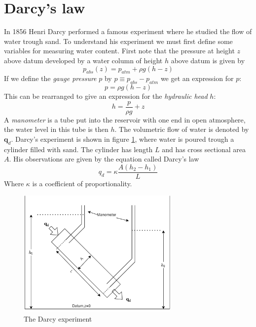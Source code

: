 \documentclass[../Main/main.tex]{subfiles}
\begin{document}
\section*{Darcy's law}
In 1856 Henri Darcy performed a famous experiment where he studied the flow of water trough sand. To understand his experiment we must first define some variables for measuring water content. First note that the pressure at height $z$ above datum developed by a water column of height $h$ above datum is given by
\begin{equation*}
p_{abs}(z) = p_{atm} + \rho g(h-z)
\end{equation*}
If we define the \emph{gauge pressure} $p$ by $p \equiv p_{abs}-p_{atm}$ we get an expression for $p$:
\begin{equation*}
p = \rho g(h-z)
\end{equation*}
This can be rearranged to give an expression for the \emph{hydraulic head} $h$:
\begin{equation}\label{eq:hydraulic}
h = \frac{p}{\rho g} + z
\end{equation}
A \emph{manometer} is a tube put into the reservoir with one end in open atmosphere, the water level in this tube is then $h$. The volumetric flow of water is denoted by $\textbf{q}_d$. Darcy's experiment is shown in figure \ref{fig:darcy}, where water is poured trough a cylinder filled with sand. The cylinder has length $L$ and has cross sectional area $A$. His observations are given by the equation called Darcy's law
\begin{equation}
q_d = \kappa \frac{A(h_2-h_1)}{L}
\end{equation}
Where $\kappa$ is a coefficient of proportionality.
\begin{figure}[h]
\centering
\includegraphics[width=0.7\textwidth]{Darcy experiment.png}
\caption{The Darcy experiment}
\label{fig:darcy}
\end{figure}
\end{document}
